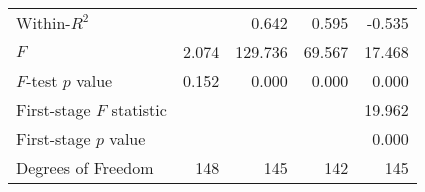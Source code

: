 \begin{tabular}{lrrrr}
Within-$R^2$              &          &    0.642 &     0.595 &                         -0.535 \\ 
$F$                       &    2.074 &  129.736 &    69.567 &                         17.468 \\ 
$F$-test $p$ value        &    0.152 &    0.000 &     0.000 &                          0.000 \\ 
First-stage $F$ statistic &          &          &           &                         19.962 \\ 
First-stage $p$ value     &          &          &           &                          0.000 \\ 
Degrees of Freedom        &      148 &      145 &       142 &                            145 \\ 
\bottomrule
\end{tabular}
